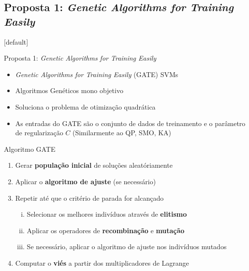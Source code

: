 \documentclass{beamer}
\begin{document}
\subsection{Proposta 1: \textit{Genetic Algorithms for Training Easily}}
[default]
\begin{frame}{Proposta 1: \textit{Genetic Algorithms for Training Easily}}
  \begin{itemize}
    \item \textit{Genetic Algorithms for Training Easily} (GATE) SVMs
    \item Algoritmos Genéticos mono objetivo
    \item Soluciona o problema de otimização quadrática
    \item As entradas do GATE são o conjunto de dados de treinamento e o parâmetro de regularização $C$ (Similarmente ao QP, SMO, KA)
  \end{itemize}
  \vspace{-0.8em}
  \begin{block}{Algoritmo GATE}
    \begin{enumerate}
      \item Gerar \textbf{população inicial} de soluções aleatóriamente
      \item Aplicar o \textbf{algoritmo de ajuste} (se necessário)
      \item Repetir até que o critério de parada for alcançado
      \begin{enumerate}[i.]
        \item Selecionar os melhores indivíduos através de \textbf{elitismo}
        \item Aplicar os operadores de \textbf{recombinação} e \textbf{mutação}
        \item Se necessário, aplicar o algoritmo de ajuste nos indivíduos mutados
      \end{enumerate}
      \item Computar o \textbf{viés} a partir dos multiplicadores de Lagrange
    \end{enumerate}
  \end{block}
\end{frame}
\end{document}
